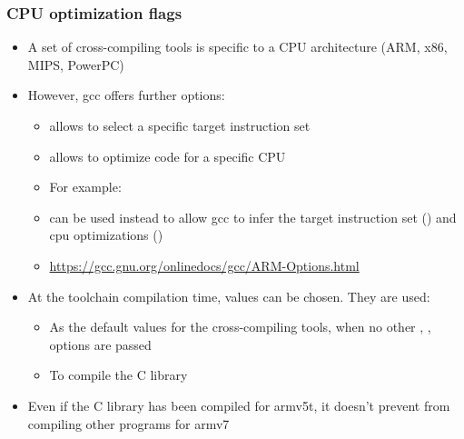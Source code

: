 \begin{frame}
  \frametitle{CPU optimization flags}
  \begin{itemize}
  \item A set of cross-compiling tools is specific to a CPU architecture (ARM,
    x86, MIPS, PowerPC)
  \item However, gcc offers further options:
    \begin{itemize}
    \item {} allows to select a specific target instruction set
    \item {} allows to optimize code for a specific CPU
    \item For example: 
    \item {} can be used instead to allow gcc to infer the target
      instruction set () and cpu optimizations ()
    \item \url{https://gcc.gnu.org/onlinedocs/gcc/ARM-Options.html}
    \end{itemize}
  \item At the toolchain compilation time, values can be chosen. They are used:
    \begin{itemize}
    \item As the default values for the cross-compiling tools, when no
      other , ,  options are
      passed
    \item To compile the C library
    \end{itemize}
  \item Even if the C library has been compiled for armv5t, it doesn't
    prevent from compiling other programs for armv7
  \end{itemize}
\end{frame}
